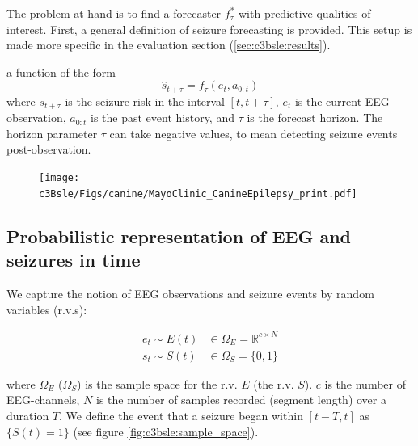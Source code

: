 The problem at hand is to find a forecaster $f_\tau^*$ with 
predictive qualities of interest. First, a general definition of seizure forecasting is provided. This setup is made more specific in the evaluation section (\ref{sec:c3bsle:results}).

\begin{definition}
    a function of the form $$ \hat{s}_{t+\tau} = f_\tau(e_t, a_{0:t})$$ where $s_{t+\tau}$ is the seizure risk in the interval $[t, t+\tau]$,  $e_t$ is the current EEG observation, $a_{0:t}$ is the past event history, and $\tau$ is the forecast horizon. The horizon parameter $\tau$ can take negative values, to mean detecting seizure events post-observation.
\end{definition}

\begin{figure}[p]
    \centering
    \texttt{[image: c3Bsle/Figs/canine/MayoClinic\_CanineEpilepsy\_print.pdf]}
    \label{fig:c3bsle:caninedb}
\end{figure}
\clearpage

\subsection{Probabilistic representation of EEG and seizures in time}
\label{sec:c3Bsle:model}

We capture the notion of EEG observations and seizure events by random variables (r.v.s):

\begin{align}
	 e_t \sim E(t) &\in \Omega_E = \mathbb{R}^{c \times N}\\
	 s_t \sim S(t) &\in \Omega_S = \{0, 1\}
\end{align}

where $\Omega_{E}$ ($\Omega_{S}$) is the sample space for the r.v. $E$ (the r.v. $S$). $c$ is the number of EEG-channels, $N$ is the number of samples recorded (\aka segment length) over a duration $T$. We define the event that a seizure began within $[t-T, t]$ as $\{S(t) = 1\}$ (see figure \ref{fig:c3bsle:sample_space}). 

